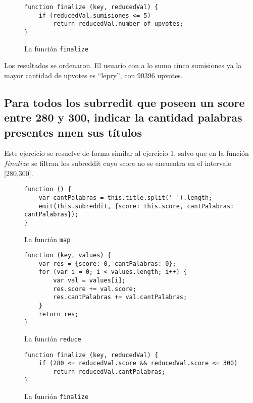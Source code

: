 \documentclass[11pt, a4paper, twoside]{article}
\begin{document}
\begin{figure}[H]
\caption{La función \texttt{finalize}}
\centering
\begin{verbatim}
function finalize (key, reducedVal) {
    if (reducedVal.sumisiones <= 5)
        return reducedVal.number_of_upvotes;
}
\end{verbatim}
\end{figure}

Los resultados se ordenaron. El usuario con a lo sumo cinco sumisiones ya la mayor cantidad de upvotes es ``lepry'', con 90396 upvotes.

\newpage
\subsection{Para todos los subrredit que poseen un score entre 280 y 300, indicar la cantidad palabras
presentes nnen sus títulos}

Este ejercicio se resuelve de forma similar al ejercicio 1, salvo que en la función $finalize$ se filtran los subreddit cuyo score no se encuentra en el intervalo [280,300].

\begin{figure}[H]
\caption{La función \texttt{map}}
\centering
\begin{verbatim}
function () {
    var cantPalabras = this.title.split(' ').length;
    emit(this.subreddit, {score: this.score, cantPalabras: cantPalabras});
}
\end{verbatim}
\end{figure}

\begin{figure}[H]
\caption{La función \texttt{reduce}}
\centering
\begin{verbatim}
function (key, values) {
    var res = {score: 0, cantPalabras: 0};
    for (var i = 0; i < values.length; i++) {
        var val = values[i];
        res.score += val.score;
        res.cantPalabras += val.cantPalabras;
    }
    return res;
}
\end{verbatim}
\end{figure}

\begin{figure}[H]
\caption{La función \texttt{finalize}}
\centering
\begin{verbatim}
function finalize (key, reducedVal) {
    if (280 <= reducedVal.score && reducedVal.score <= 300)
        return reducedVal.cantPalabras;
}
\end{verbatim}
\end{figure}
\end{document}
